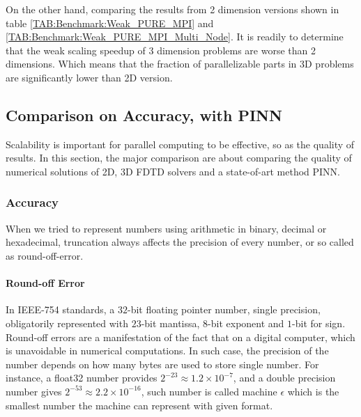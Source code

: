 On the other hand, comparing the results from 2 dimension versions shown in table \ref{TAB:Benchmark:Weak_PURE_MPI} and \ref{TAB:Benchmark:Weak_PURE_MPI_Multi_Node}.
It is readily to determine that the weak scaling speedup of 3 dimension problems are worse than 2 dimensions.
Which means that the fraction of parallelizable parts in 3D problems are significantly lower than 2D version.

















\subsection{Comparison on Accuracy, with PINN}
Scalability is important for parallel computing to be effective, so as the quality of results.
In this section, the major comparison are about comparing the quality of numerical solutions of 
2D, 3D FDTD solvers and a state-of-art method PINN.


\subsubsection{Accuracy}
When we tried to represent numbers using arithmetic in binary, decimal or hexadecimal, truncation always affects the precision of every number, 
or so called as 
round-off-error.


\paragraph{Round-off Error}
In IEEE-754 \cite{IEEE_754} standards, a $32$-bit floating pointer number, single precision, obligatorily represented with $23$-bit mantissa, 
$8$-bit exponent and $1$-bit for sign. 
Round-off errors are a manifestation of the fact that on a digital computer, which is unavoidable in numerical computations.
In such case, the precision of the number depends on how many bytes are used to store single number. 
For instance, a float32 number provides $2^{-23} \approx 1.2\times10^{-7}$, and a double precision number gives $2^{-53} \approx 2.2\times10^{-16}$, 
such number is called machine $\epsilon$ which is the smallest number the machine can represent with given format.

